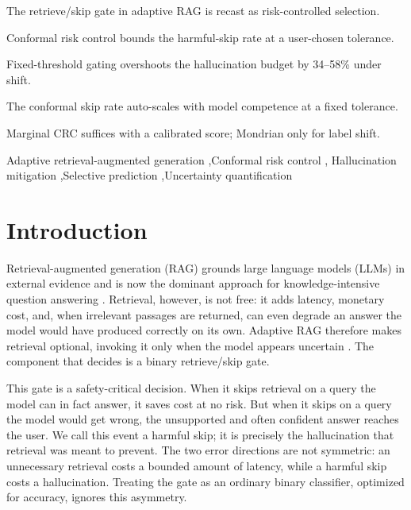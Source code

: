 \documentclass[a4paper,fleqn]{cas-dc}
\begin{document}
\begin{highlights}
\item The retrieve/skip gate in adaptive RAG is recast as risk-controlled selection.
\item Conformal risk control bounds the harmful-skip rate at a user-chosen tolerance.
\item Fixed-threshold gating overshoots the hallucination budget by 34--58\% under shift.
\item The conformal skip rate auto-scales with model competence at a fixed tolerance.
\item Marginal CRC suffices with a calibrated score; Mondrian only for label shift.
\end{highlights}

\begin{keywords}
Adaptive retrieval-augmented generation \sep Conformal risk control \sep
Hallucination mitigation \sep Selective prediction \sep Uncertainty quantification
\end{keywords}

\maketitle

\section{Introduction}\label{sec:intro}

Retrieval-augmented generation (RAG) grounds large language models (LLMs) in
external evidence and is now the dominant approach for knowledge-intensive
question answering \citep{lewis2020rag,gao2023ragsurvey}. Retrieval, however, is
not free: it adds latency, monetary cost, and, when irrelevant passages are
returned, can even degrade an answer the model would have produced correctly on
its own. Adaptive RAG therefore makes retrieval optional, invoking it
only when the model appears uncertain \citep{jiang2023flare,asai2024selfrag,
jeong2024adaptiverag}. The component that decides is a binary
retrieve/skip gate.

This gate is a safety-critical decision. When it skips retrieval on a query the
model can in fact answer, it saves cost at no risk. But when it skips on a query
the model would get wrong, the unsupported and often confident answer
reaches the user. We call this event a harmful skip; it is precisely the
hallucination that retrieval was meant to prevent. The two error directions are
not symmetric: an unnecessary retrieval costs a bounded amount of latency, while
a harmful skip costs a hallucination. Treating the gate as an ordinary binary
classifier, optimized for accuracy, ignores this asymmetry.
\end{document}
